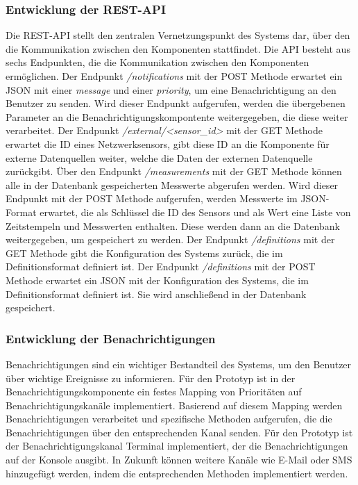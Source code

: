 \subsubsection{Entwicklung der REST-API}
Die REST-API stellt den zentralen Vernetzungspunkt des Systems dar, über den die Kommunikation zwischen den Komponenten stattfindet.
Die API besteht aus sechs Endpunkten, die die Kommunikation zwischen den Komponenten ermöglichen.
Der Endpunkt \emph{/notifications} mit der POST Methode erwartet ein JSON mit einer \emph{message} und einer \emph{priority}, um eine Benachrichtigung an den Benutzer zu senden.
Wird dieser Endpunkt aufgerufen, werden die übergebenen Parameter an die Benachrichtigungskompontente weitergegeben, die diese weiter verarbeitet.
Der Endpunkt \emph{/external/<sensor\_id>} mit der GET Methode erwartet die ID eines Netzwerksensors, gibt diese ID an die Komponente für externe Datenquellen weiter, welche die Daten der externen Datenquelle zurückgibt.
Über den Endpunkt \emph{/measurements} mit der GET Methode können alle in der Datenbank gespeicherten Messwerte abgerufen werden.
Wird dieser Endpunkt mit der POST Methode aufgerufen, werden Messwerte im JSON-Format erwartet, die als Schlüssel die ID des Sensors und als Wert eine Liste von Zeitstempeln und Messwerten enthalten.
Diese werden dann an die Datenbank weitergegeben, um gespeichert zu werden.
Der Endpunkt \emph{/definitions} mit der GET Methode gibt die Konfiguration des Systems zurück, die im Definitionsformat definiert ist.
Der Endpunkt \emph{/definitions} mit der POST Methode erwartet ein JSON mit der Konfiguration des Systems, die im Definitionsformat definiert ist.
Sie wird anschließend in der Datenbank gespeichert.

\subsubsection{Entwicklung der Benachrichtigungen}
Benachrichtigungen sind ein wichtiger Bestandteil des Systems, um den Benutzer über wichtige Ereignisse zu informieren.
Für den Prototyp ist in der Benachrichtigungskomponente ein festes Mapping von Prioritäten auf Benachrichtigungskanäle implementiert.
Basierend auf diesem Mapping werden Benachrichtigungen verarbeitet und spezifische Methoden aufgerufen, die die Benachrichtigungen über den entsprechenden Kanal senden.
Für den Prototyp ist der Benachrichtigungskanal Terminal implementiert, der die Benachrichtigungen auf der Konsole ausgibt.
In Zukunft können weitere Kanäle wie E-Mail oder SMS hinzugefügt werden, indem die entsprechenden Methoden implementiert werden.

